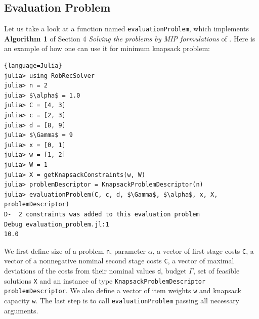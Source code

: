 \subsection{Evaluation Problem}
Let us take a look at a function named \texttt{evaluationProblem}, which implements \textbf{Algorithm 1} of Section 4 \textit{Solving the problems by MIP formulations} of \cite{HKZ19}. Here is an example of how one can use it for minimum knapsack problem:
\begin{lstlisting}[mathescape]{language=Julia}
julia> using RobRecSolver
julia> n = 2
julia> $\alpha$ = 1.0
julia> C = [4, 3]
julia> c = [2, 3]
julia> d = [8, 9]
julia> $\Gamma$ = 9
julia> x = [0, 1]
julia> w = [1, 2]
julia> W = 1
julia> X = getKnapsackConstraints(w, W)
julia> problemDescriptor = KnapsackProblemDescriptor(n)
julia> evaluationProblem(C, c, d, $\Gamma$, $\alpha$, x, X, problemDescriptor)
D-  2 constraints was added to this evaluation problem                 Debug evaluation_problem.jl:1
10.0
\end{lstlisting}
We first define size of a problem \texttt{n}, parameter  \texttt{$\alpha$}, a vector of first stage costs  \texttt{C}, a vector of a nonnegative nominal second stage costs  \texttt{C}, a vector of maximal deviations of the costs from their nominal values  \texttt{d}, budget  \texttt{$\Gamma$}, set of feasible solutions \texttt{X} and an instance of type \texttt{KnapsackProblemDescriptor} \texttt{problemDescriptor}. We also define a vector of item weights \texttt{w} and knapsack capacity \texttt{w}. The last step is to call \texttt{evaluationProblem} passing all necessary arguments.

